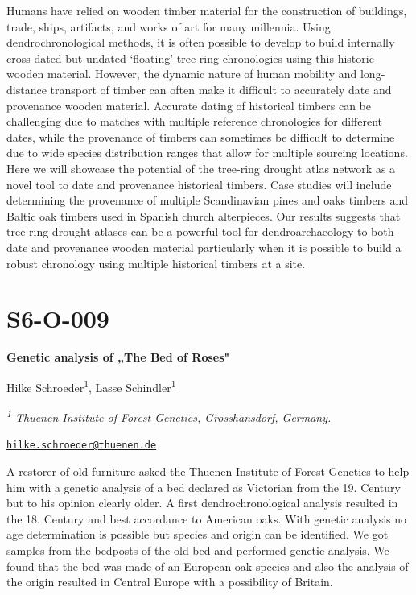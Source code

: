 \documentclass[
]{book}
\begin{document}
Humans have relied on wooden timber material for the construction of buildings, trade, ships, artifacts, and works of art for many millennia. Using dendrochronological methods, it is often possible to develop to build internally cross-dated but undated `floating' tree-ring chronologies using this historic wooden material. However, the dynamic nature of human mobility and long-distance transport of timber can often make it difficult to accurately date and provenance wooden material. Accurate dating of historical timbers can be challenging due to matches with multiple reference chronologies for different dates, while the provenance of timbers can sometimes be difficult to determine due to wide species distribution ranges that allow for multiple sourcing locations. Here we will showcase the potential of the tree-ring drought atlas network as a novel tool to date and provenance historical timbers. Case studies will include determining the provenance of multiple Scandinavian pines and oaks timbers and Baltic oak timbers used in Spanish church alterpieces. Our results suggests that tree-ring drought atlases can be a powerful tool for dendroarchaeology to both date and provenance wooden material particularly when it is possible to build a robust chronology using multiple historical timbers at a site.

\hypertarget{s6-o-009}{%
\section*{S6-O-009}\label{s6-o-009}}

\textbf{Genetic analysis of „The Bed of Roses"}

Hilke Schroeder\textsuperscript{1}, Lasse Schindler\textsuperscript{1}

\emph{\textsuperscript{1} Thuenen Institute of Forest Genetics, Grosshansdorf, Germany.}

\href{mailto:hilke.schroeder@thuenen.de}{\nolinkurl{hilke.schroeder@thuenen.de}}

A restorer of old furniture asked the Thuenen Institute of Forest Genetics to help him with a genetic analysis of a bed declared as Victorian from the 19. Century but to his opinion clearly older. A first dendrochronological analysis resulted in the 18. Century and best accordance to American oaks. With genetic analysis no age determination is possible but species and origin can be identified. We got samples from the bedposts of the old bed and performed genetic analysis. We found that the bed was made of an European oak species and also the analysis of the origin resulted in Central Europe with a possibility of Britain.
\end{document}

